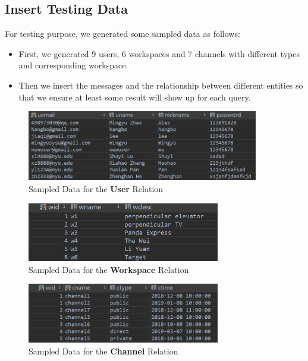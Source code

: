\subsection{Insert Testing Data}
For testing purpose, we generated some sampled data as follows:
\begin{itemize}
    \item First, we generated 9 users, 6 workspaces and 7 channels with different types and corresponding workspace.
    \item Then we insert the messages and the relationship between different entities so that we ensure at least some result will show up for each query.
\end{itemize}

\begin{figure}[ht!]
    \centering
    \includegraphics[width=0.9\textwidth]{img/User.JPG}
    \caption{Sampled Data for the \textbf{User} Relation}
\end{figure}

\FloatBarrier

\begin{figure}[ht!]
    \centering
    \includegraphics[width=0.75\textwidth]{img/Workspace.JPG}
    \caption{Sampled Data for the \textbf{Workspace} Relation}
\end{figure}

\FloatBarrier

\begin{figure}[ht!]
    \centering
    \includegraphics[width=0.75\textwidth]{img/channel.JPG}
    \caption{Sampled Data for the \textbf{Channel} Relation}
\end{figure}

